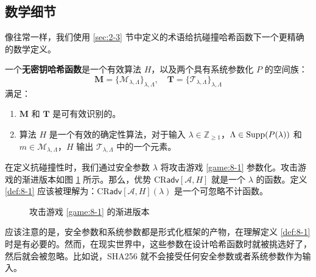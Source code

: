\subsection{数学细节}\label{subsec:8-1-1}

像往常一样，我们使用 \ref{sec:2-3} 节中定义的术语给抗碰撞哈希函数下一个更精确的数学定义。

\begin{definition}[无密钥哈希函数]\label{def:8-2}
一个\textbf{无密钥哈希函数}是一个有效算法 $H$，以及两个具有系统参数化 $P$ 的空间族：
\[
\mathbf{M}=\{\mathcal{M}_{\lambda,\Lambda}\}_{\lambda,\Lambda},\quad
\mathbf{T}=\{\mathcal{T}_{\lambda,\Lambda}\}_{\lambda,\Lambda}
\]
满足：
\begin{enumerate}
	\item $\mathbf{M}$ 和 $\mathbf{T}$ 是可有效识别的。
	\item 算法 $H$ 是一个有效的确定性算法，对于输入 $\lambda\in\mathbb{Z}_{\geq1}$，$\Lambda\in{\rm Supp}(P(\lambda))$ 和 $m\in\mathcal{M}_{\lambda,\Lambda}$，$H$ 输出 $\mathcal{T}_{\lambda,\Lambda}$ 中的一个元素。
\end{enumerate}
\end{definition}

在定义抗碰撞性时，我们通过安全参数 $\lambda$ 将攻击游戏 \ref{game:8-1} 参数化。攻击游戏的渐进版本如图 \ref{fig:8-3} 所示。那么，优势 $\mathrm{CR}\mathsf{adv}[\mathcal{A},H]$ 就是一个 $\lambda$ 的函数。定义 \ref{def:8-1} 应该被理解为：$\mathrm{CR}\mathsf{adv}[\mathcal{A},H](\lambda)$ 是一个可忽略不计函数。

\begin{figure}
	\centering
	
	\caption{攻击游戏 \ref{game:8-1} 的渐进版本}
	\label{fig:8-3}
\end{figure}

应该注意的是，安全参数和系统参数都是形式化框架的产物，在理解定义 \ref{def:8-1} 时是有必要的。然而，在现实世界中，这些参数在设计哈希函数时就被挑选好了，然后就会被忽略。比如说，SHA256 就不会接受任何安全参数或者系统参数作为输入。